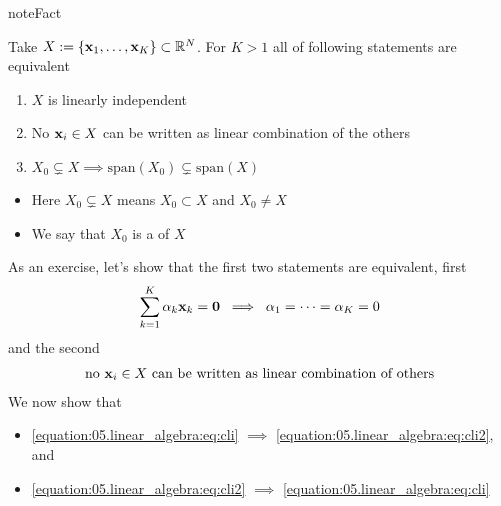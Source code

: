 \documentclass[letterpaper,10pt,english]{jupyterBook}
\begin{document}
\begin{sphinxadmonition}{note}{Fact}

\sphinxAtStartPar
Take \(X := \{{\bf x}_1,\ldots, {\bf x}_K\} \subset \mathbb{R}^N\).
For \(K > 1\) all of following statements are equivalent
\begin{enumerate}
%
\item {} 
\sphinxAtStartPar
\(X\) is linearly independent

\item {} 
\sphinxAtStartPar
No \({\bf x}_i \in X\) can be written as linear combination of the others

\item {} 
\sphinxAtStartPar
\(X_0 \subsetneq X \implies \mathrm{span}(X_0) \subsetneq \mathrm{span}(X)\)

\end{enumerate}
\end{sphinxadmonition}
\begin{itemize}
\item {} 
\sphinxAtStartPar
Here \(X_0 \subsetneq X\) means \(X_0 \subset X\) and \(X_0 \ne X\)

\item {} 
\sphinxAtStartPar
We say that \(X_0\) is a  of \(X\)

\end{itemize}

\sphinxAtStartPar
As an exercise, let’s show that the first two statements are equivalent, first
\begin{equation}\label{equation:05.linear_algebra:eq:cli}
\begin{split}
\sum_{k=1}^K \alpha_k {\bf x}_k
= {\bf 0} 
\; \implies \;
\alpha_1 = \cdots = \alpha_K = 0
\end{split}
\end{equation}
\sphinxAtStartPar
and the second
\begin{equation}\label{equation:05.linear_algebra:eq:cli2}
\begin{split}
\text{no ${\bf x}_i \in X$ can be written as linear combination of others}
\end{split}
\end{equation}
\sphinxAtStartPar
We now show that
\begin{itemize}
\item {} 
\sphinxAtStartPar
\eqref{equation:05.linear_algebra:eq:cli} \(\implies\) \eqref{equation:05.linear_algebra:eq:cli2}, and

\item {} 
\sphinxAtStartPar
\eqref{equation:05.linear_algebra:eq:cli2} \(\implies\) \eqref{equation:05.linear_algebra:eq:cli}

\end{itemize}
\end{document}
